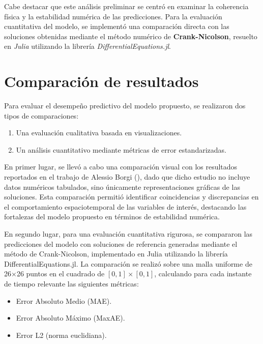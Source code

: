 \documentclass[
  spanish,
  us-letterpaper,
  DIV=11,
  numbers=noendperiod]{scrreprt}
\providecommand{\tightlist}{%
  \setlength{\itemsep}{0pt}\setlength{\parskip}{0pt}}
\theoremstyle{plain}
\theoremstyle{definition}
\theoremstyle{remark}
\begin{document}
Cabe destacar que este análisis preliminar se centró en examinar la
coherencia física y la estabilidad numérica de las predicciones. Para la
evaluación cuantitativa del modelo, se implementó una comparación
directa con las soluciones obtenidas mediante el método numérico de
\textbf{Crank-Nicolson}, resuelto en \emph{Julia} utilizando la librería
\emph{DifferentialEquations.jl}.

\section{Comparación de resultados}\label{comparaciuxf3n-de-resultados}

Para evaluar el desempeño predictivo del modelo propuesto, se realizaron
dos tipos de comparaciones:

\begin{enumerate}
\def\labelenumi{\arabic{enumi}.}
\tightlist
\item
  Una evaluación cualitativa basada en visualizaciones.
\item
  Un análisis cuantitativo mediante métricas de error estandarizadas.
\end{enumerate}

En primer lugar, se llevó a cabo una comparación visual con los
resultados reportados en el trabajo de Alessio Borgi
(), dado que dicho estudio no incluye
datos numéricos tabulados, sino únicamente representaciones gráficas de
las soluciones. Esta comparación permitió identificar coincidencias y
discrepancias en el comportamiento espaciotemporal de las variables de
interés, destacando las fortalezas del modelo propuesto en términos de
estabilidad numérica.

En segundo lugar, para una evaluación cuantitativa rigurosa, se
compararon las predicciones del modelo con soluciones de referencia
generadas mediante el método de Crank-Nicolson, implementado en Julia
utilizando la librería DifferentialEquations.jl. La comparación se
realizó sobre una malla uniforme de 26×26 puntos en el cuadrado de
\([0,1]\times[0,1]\), calculando para cada instante de tiempo relevante
las siguientes métricas:

\begin{itemize}
\tightlist
\item
  Error Absoluto Medio (MAE).
\item
  Error Absoluto Máximo (MaxAE).
\item
  Error L2 (norma euclidiana).
\end{itemize}
\end{document}
